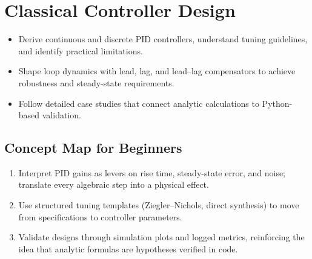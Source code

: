 \chapter{Classical Controller Design}
\label{chap:classical}

\begin{learningobjective}
\begin{itemize}[leftmargin=*]
    \item Derive continuous and discrete PID controllers, understand tuning guidelines, and identify practical limitations.
    \item Shape loop dynamics with lead, lag, and lead--lag compensators to achieve robustness and steady-state requirements.
    \item Follow detailed case studies that connect analytic calculations to Python-based validation.
\end{itemize}
\end{learningobjective}

\section{Concept Map for Beginners}
\begin{conceptroadmap}
\begin{enumerate}[leftmargin=*]
    \item Interpret PID gains as levers on rise time, steady-state error, and noise; translate every algebraic step into a physical effect.
    \item Use structured tuning templates (Ziegler--Nichols, direct synthesis) to move from specifications to controller parameters.
    \item Validate designs through simulation plots and logged metrics, reinforcing the idea that analytic formulas are hypotheses verified in code.
\end{enumerate}
\end{conceptroadmap}

